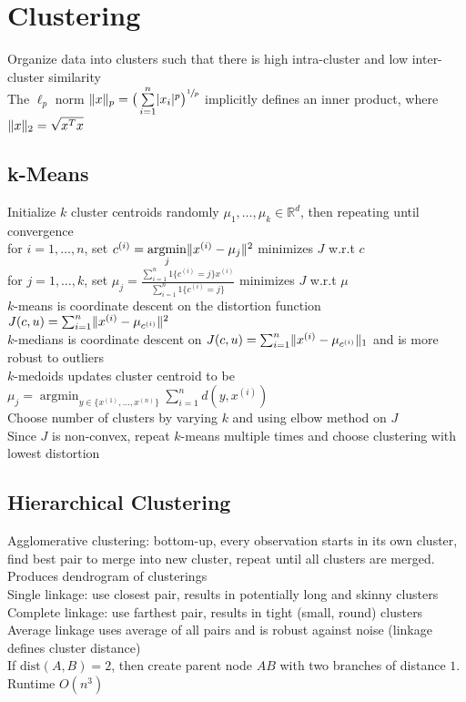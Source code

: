 \documentclass{article}
\newcommand{\R}{\mathbb{R}}
\DeclareMathOperator*{\argmin}{argmin}
\DeclarePairedDelimiter\abs{\lvert}{\rvert}
\DeclarePairedDelimiter\norm{\lVert}{\rVert}
\begin{document}
\newpage
\section{Clustering}
Organize data into clusters such that there is high intra-cluster and low inter-cluster similarity \\
The $\ell_p$ norm $\norm{x}_p = \big(\sum\limits_{i=1}^n \abs{x_i}^p \big)^{\sfrac{1}{p}}$ implicitly defines an inner product, where $\norm{x}_2 =  \sqrt{x^Tx}$ 

\subsection{k-Means}
Initialize $k$ cluster centroids randomly ${\mu_1}, \ldots, {\mu_k} \in \R^d$, then repeating until convergence \\
for $i = 1, \ldots, n$, set $c^{(i)} = \argmin\limits_j \norm{{x^{(i)}}- {\mu_j}}^2$ minimizes $J$ w.r.t $ c$ \\
for $j = 1, \ldots, k$, set ${\mu_j} = \frac{\sum_{i=1}^n 1\{c^{(i)}=j \}{x^{(i)}}}{\sum_{i=1}^n 1\{c^{(i)}=j \}}$ minimizes $J$ w.r.t $ \mu$ \\
$k$-means is coordinate descent on the distortion function $J(c, u) =\sum_{i=1}^n \norm{{x^{(i)}}-{\mu}_{c^{(i)}}}^2$ \\
$k$-medians is coordinate descent on $J( c,  u) =\sum_{i=1}^n \norm{{x^{(i)}}-{\mu}_{c^{(i)}}}_1$ and is more robust to outliers  \\
$k$-medoids updates cluster centroid to be ${\mu_j} = \argmin_{y \in \{x^{(1)}, \ldots, x^{(n)} \}} \sum_{i=1}^n d(y, x^{(i)})$ \\
Choose number of clusters by varying $k$ and using elbow method on $J$ \\
Since $J$ is non-convex, repeat $k$-means multiple times and choose clustering with lowest distortion 

\subsection{Hierarchical Clustering}
Agglomerative clustering: bottom-up, every observation starts in its own cluster, find best pair to merge into new cluster, repeat until all clusters are merged. Produces dendrogram of clusterings \\
Single linkage: use closest pair, results in potentially long and skinny clusters \\
Complete linkage: use farthest pair, results in tight (small, round) clusters \\
Average linkage uses average of all pairs and is robust against noise (linkage defines cluster distance) \\
If $\mbox{dist}(A, B) = 2$, then create parent node $AB$ with two branches of distance $1$. Runtime $O(n^3)$
\end{document}
